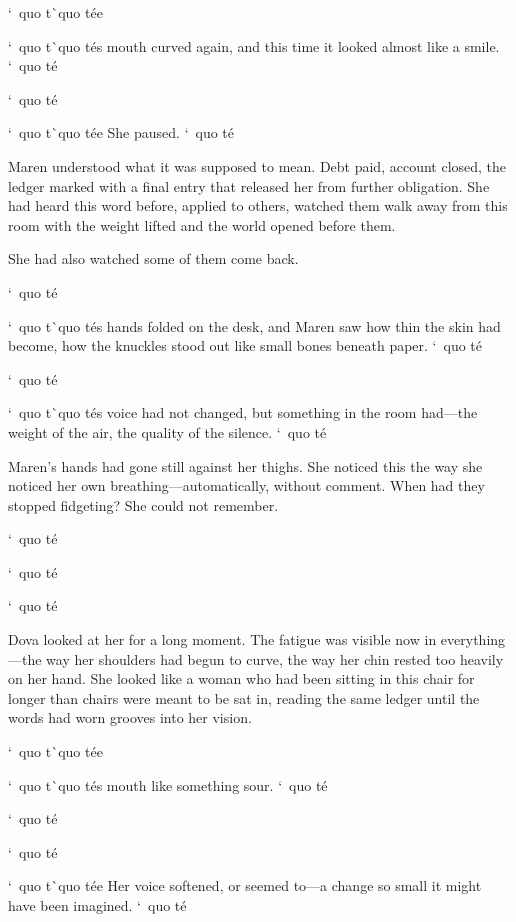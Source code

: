 \documentclass[12pt,letterpaper,openany]{book}
\begin{document}
\par
`\ quo t\`\ quo t\'e{}e{}
\par
`\ quo t\`\ quo t\'e{}s mouth curved again, and this time it looked almost like a smile. `\ quo t\'e{}
\par
`\ quo t\'e{}
\par
`\ quo t\`\ quo t\'e{}e{} She paused. `\ quo t\'e{}
\par
Maren understood what it was supposed to mean. Debt paid, account closed, the ledger marked with a final entry that released her from further obligation. She had heard this word before, applied to others, watched them walk away from this room with the weight lifted and the world opened before them.
\par
She had also watched some of them come back.
\par
`\ quo t\'e{}
\par
`\ quo t\`\ quo t\'e{}s hands folded on the desk, and Maren saw how thin the skin had become, how the knuckles stood out like small bones beneath paper. `\ quo t\'e{}
\par
`\ quo t\'e{}
\par
`\ quo t\`\ quo t\'e{}s voice had not changed, but something in the room had—the weight of the air, the quality of the silence. `\ quo t\'e{}
\par
Maren's hands had gone still against her thighs. She noticed this the way she noticed her own breathing—automatically, without comment. When had they stopped fidgeting? She could not remember.
\par
`\ quo t\'e{}
\par
`\ quo t\'e{}
\par
`\ quo t\'e{}
\par
Dova looked at her for a long moment. The fatigue was visible now in everything—the way her shoulders had begun to curve, the way her chin rested too heavily on her hand. She looked like a woman who had been sitting in this chair for longer than chairs were meant to be sat in, reading the same ledger until the words had worn grooves into her vision.
\par
`\ quo t\`\ quo t\'e{}e{}
\par
`\ quo t\`\ quo t\'e{}s mouth like something sour. `\ quo t\'e{}
\par
`\ quo t\'e{}
\par
`\ quo t\'e{}
\par
`\ quo t\`\ quo t\'e{}e{} Her voice softened, or seemed to—a change so small it might have been imagined. `\ quo t\'e{}
\end{document}
